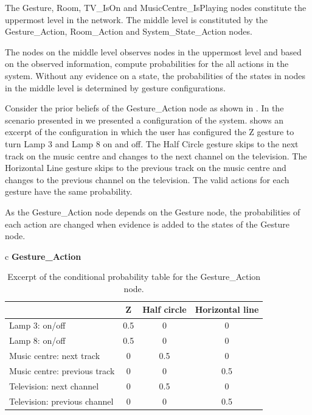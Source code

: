 The Gesture, Room, TV\_IsOn and MusicCentre\_IsPlaying nodes constitute the uppermost level in the network. The middle level is constituted by the Gesture\_Action, Room\_Action and System\_State\_Action nodes.

The nodes on the middle level observes nodes in the uppermost level and based on the observed information, compute probabilities for the all actions in the system. Without any evidence on a state, the probabilities of the states in nodes in the middle level is determined by gesture configurations.

Consider the prior beliefs of the Gesture\_Action node as shown in . In the scenario presented in  we presented a configuration of the system.  shows an excerpt of the configuration in which the user has configured the Z gesture to turn Lamp 3 and Lamp 8 on and off. The Half Circle gesture skips to the next track on the music centre and changes to the next channel on the television. The Horizontal Line gesture skips to the previous track on the music centre and changes to the previous channel on the television. The valid actions for each gesture have the same probability.

As the Gesture\_Action node depends on the Gesture node, the probabilities of each action are changed when evidence is added to the states of the Gesture node.

\begin{table}[h!]
\centering
\caption{Excerpt of the conditional probability table for the Gesture\_Action node.}
\label{tbl:design:bayesian-network:cpt-gesture-action}
\begin{tabular}{c}
\textbf{Gesture\_Action}   \\
\begin{tabular}{l|ccc}
                             & Z   & Half circle & Horizontal line \\ \hline
Lamp 3: on/off               & 0.5 & 0             & 0                \\
Lamp 8: on/off               & 0.5 & 0             & 0                \\
Music centre: next track     & 0   & 0.5             & 0                \\
Music centre: previous track & 0   & 0             & 0.5              \\
Television: next channel     & 0   & 0.5             & 0                \\
Television: previous channel & 0   & 0             & 0.5
\end{tabular}
\end{tabular}
\end{table}

